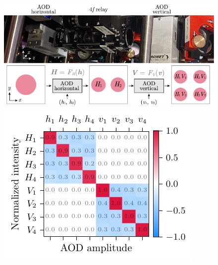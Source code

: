 


\begin{figure}
    \centering
    \includegraphics{fig-ai/crossed-aod.pdf}
    \hfill
    \includegraphics{fig-py/crosstalk-camera.pdf}
    \newline
    \phantom{42}
    \newline

\end{figure}
